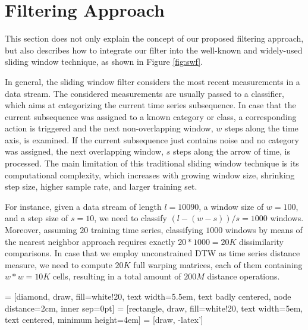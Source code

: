 \section{Filtering Approach} \label{filtering_approach}

This section does not only explain the concept of our proposed filtering approach, but also describes how to integrate our filter into the well-known and widely-used sliding window technique, as shown in Figure \ref{fig:swf}.

In general, the sliding window filter considers the most recent measurements in a data stream. The considered measurements are usually passed to a classifier, which aims at categorizing the current time series subsequence. In case that the current subsequence was assigned to a known category or class, a corresponding action is triggered and the next non-overlapping window, $w$ steps along the time axis, is examined. If the current subsequence just contains noise and no category was assigned, the next overlapping window, $s$ steps along the arrow of time, is processed. The main limitation of this traditional sliding window technique is its computational complexity, which increases with growing window size, shrinking step size, higher sample rate, and larger training set. %

For instance, given a data stream of length $l {=} 10090$, a window size of $w {=} 100$, and a step size of $s {=} 10$, we need to classify $(l - (w - s)) / s = 1000$ windows. Moreover, assuming $20$ training time series, classifying $1000$ windows by means of the nearest neighbor approach requires exactly $20*1000=20K$ dissimilarity comparisons. In case that we employ unconstrained DTW as time series distance measure, we need to compute $20K$ full warping matrices, each of them containing $w*w = 10K$ cells, resulting in a total amount of $200M$ distance operations.


 = [diamond, draw, fill=white!20, text width=5.5em, text badly centered, node distance=2cm, inner sep=0pt]
 = [rectangle, draw, fill=white!20, text width=5em, text centered, minimum height=4em]
 = [draw, -latex']

